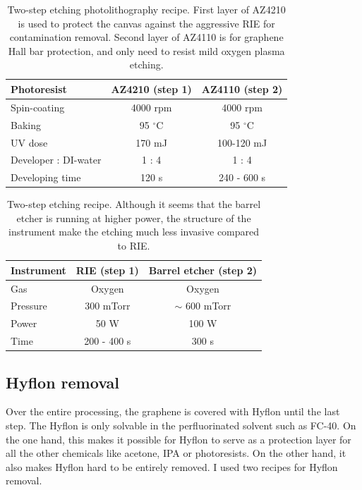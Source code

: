 \documentclass[pdflatex, sectionletters, 12pt]{pittetd}    %
\begin{document}
\begin{table}
	\centering
	\begin{tabular}{l|cc}
		\hline
		Photoresist    & AZ4210 (step 1) & AZ4110 (step 2) \\ \hline
		Spin-coating    &    4000 rpm    &    4000 rpm \\ 
		Baking    &    95 $^{\circ}$C    &    95 $^{\circ}$C    \\ 
		UV dose    &    170 mJ    &    100-120 mJ    \\
		Developer : DI-water    &    1 : 4 &    1 : 4 \\ 
		Developing time    &    120 s    &    240 - 600 s \\
		\hline
	\end{tabular}
	\caption{Two-step etching photolithography recipe. First layer of AZ4210 is used to protect the canvas against the aggressive RIE for contamination removal. Second layer of AZ4110 is for graphene Hall bar protection, and only need to resist mild oxygen plasma etching.}
	\label{TAB:TwoStepPL}
\end{table}

\begin{table}
	\centering
	\begin{tabular}{l|cc}
		\hline
		Instrument    & RIE (step 1)    &    Barrel etcher (step 2) \\ \hline
		Gas    &    Oxygen &    Oxygen \\ 
		Pressure    &    300 mTorr    &    $\sim$ 600 mTorr \\
		Power    &    50 W    &    100 W \\
		Time    &    200 - 400 s &    300 s\\ \hline
	\end{tabular}
	\caption{Two-step etching recipe. Although it seems that the barrel etcher is running at higher power, the structure of the instrument make the etching much less invasive compared to RIE.}
	\label{TAB:TwoStepEtching}
\end{table}

\subsection{Hyflon removal}

Over the entire processing, the graphene is covered with Hyflon until the last step. The Hyflon is only solvable in the perfluorinated solvent such as FC-40. On the one hand, this makes it possible for Hyflon to serve as a protection layer for all the other chemicals like acetone, IPA or photoresists. On the other hand, it also makes Hyflon hard to be entirely removed. I used two recipes for Hyflon removal. 
\end{document}
